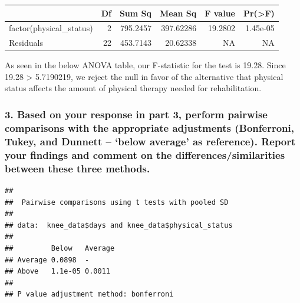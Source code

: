 \documentclass[]{article}
\newenvironment{Shaded}{\begin{snugshade}}{\end{snugshade}}
\newcommand{\KeywordTok}[1]{\textcolor[rgb]{0.13,0.29,0.53}{\textbf{#1}}}
\newcommand{\DataTypeTok}[1]{\textcolor[rgb]{0.13,0.29,0.53}{#1}}
\newcommand{\StringTok}[1]{\textcolor[rgb]{0.31,0.60,0.02}{#1}}
\newcommand{\CommentTok}[1]{\textcolor[rgb]{0.56,0.35,0.01}{\textit{#1}}}
\newcommand{\OperatorTok}[1]{\textcolor[rgb]{0.81,0.36,0.00}{\textbf{#1}}}
\newcommand{\NormalTok}[1]{#1}
\begin{document}
\begin{longtable}[]{@{}lrrrrr@{}}
\toprule
& Df & Sum Sq & Mean Sq & F value & Pr(\textgreater{}F)\tabularnewline
\midrule
\endhead
factor(physical\_status) & 2 & 795.2457 & 397.62286 & 19.2802 &
1.45e-05\tabularnewline
Residuals & 22 & 453.7143 & 20.62338 & NA & NA\tabularnewline
\bottomrule
\end{longtable}

As seen in the below ANOVA table, our F-statistic for the test is 19.28.
Since 19.28 \textgreater{} 5.7190219, we reject the null in favor of the
alternative that physical status affects the amount of physical therapy
needed for rehabilitation.

\subsubsection{\texorpdfstring{3. Based on your response in part 3,
perform pairwise comparisons with the appropriate adjustments
(Bonferroni, Tukey, and Dunnett -- `below average' as reference). Report
your findings and comment on the differences/similarities between these
three
methods.}{3. Based on your response in part 3, perform pairwise comparisons with the appropriate adjustments (Bonferroni, Tukey, and Dunnett -- below average as reference). Report your findings and comment on the differences/similarities between these three methods.}}\label{based-on-your-response-in-part-3-perform-pairwise-comparisons-with-the-appropriate-adjustments-bonferroni-tukey-and-dunnett-below-average-as-reference.-report-your-findings-and-comment-on-the-differencessimilarities-between-these-three-methods.}

\begin{Shaded}
\end{Shaded}

\begin{verbatim}
## 
##  Pairwise comparisons using t tests with pooled SD 
## 
## data:  knee_data$days and knee_data$physical_status 
## 
##         Below   Average
## Average 0.0898  -      
## Above   1.1e-05 0.0011 
## 
## P value adjustment method: bonferroni
\end{verbatim}
\end{document}
